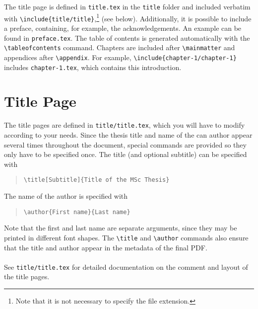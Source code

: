 The title page is defined in \texttt{title.tex} in the \texttt{title} folder and included verbatim with \texttt{\textbackslash include\{title/title\}},\footnote{Note that it is not necessary to specify the file extension.} (see below). Additionally, it is possible to include a preface, containing, for example, the acknowledgements. An example can be found in \texttt{preface.tex}. The table of contents is generated automatically with the \texttt{\textbackslash tableofcontents} command. Chapters are included after \texttt{\textbackslash mainmatter} and appendices after \texttt{\textbackslash appendix}. For example, \texttt{\textbackslash include\{chapter-1/chapter-1\}} includes \texttt{chapter-1.tex}, which contains this introduction.
\section{Title Page}
The title pages are defined in \texttt{title/title.tex}, which you will have to modify according to your needs. 
Since the thesis title and name of the can author appear several times throughout the document, special commands are provided so they only have to be specified once. The title (and optional subtitle) can be specified with
\begin{quote}
\texttt{\textbackslash title[Subtitle]\{Title of the MSc Thesis\}}
\end{quote}
The name of the author is specified with
\begin{quote}
\texttt{\textbackslash author\{First name\}\{Last name\}}
\end{quote}
Note that the first and last name are separate arguments, since they may be printed in different font shapes. The \texttt{\textbackslash title} and \texttt{\textbackslash author} commands also ensure that the title and author appear in the metadata of the final PDF.\\\\
See \texttt{title/title.tex} for detailed documentation on the comment and layout of the title pages.
